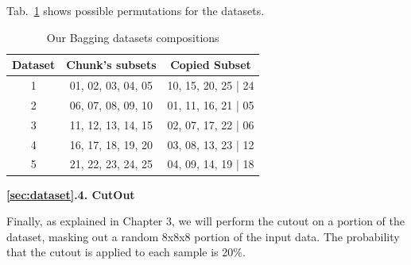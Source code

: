  Tab.~\ref{tab:partitions} shows possible permutations for the datasets.

\begin{table}[h]
	\centering
	\caption{Our Bagging datasets compositions}
	\label{tab:partitions}
	\begin{tabular}{|c||c|c|}
		\hline
		Dataset & Chunk's subsets & Copied Subset \\
		\hline
		\hline
            1 & \small{01, 02, 03, 04, 05} & \small{10, 15, 20, 25 | 24}\\\hline
            2 & \small{06, 07, 08, 09, 10} & \small{01, 11, 16, 21 | 05}\\\hline
            3 & \small{11, 12, 13, 14, 15} & \small{02, 07, 17, 22 | 06}\\\hline
            4 & \small{16, 17, 18, 19, 20} & \small{03, 08, 13, 23 | 12}\\\hline
            5 & \small{21, 22, 23, 24, 25} & \small{04, 09, 14, 19 | 18}\\\hline
	\end{tabular}
\end{table}


\textbf{\ref{sec:dataset}.4. CutOut}

Finally, as explained in Chapter 3, we will perform the cutout on a portion of the dataset, masking out a random 8x8x8 portion of the input data. The probability that the cutout is applied to each sample is 20\%.